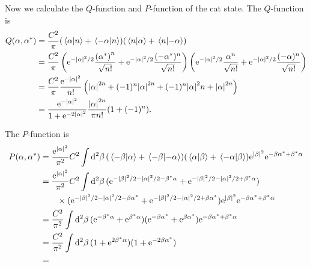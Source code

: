 \documentclass[hyperref, a4paper]{article}
\newcommand*{\ee}{\mathrm{e}}
\begin{document}
\begin{itemize}
    Now we calculate the $Q$-function and $P$-function of the cat state.
    The $Q$-function is 
    \[
        \begin{aligned}
            Q(\alpha, \alpha^*) &= \frac{C^2}{\pi} (\braket*{\alpha}{n} + \braket*{-\alpha}{n}) (\braket*{n}{\alpha} + \braket*{n}{-\alpha}) \\
            &= \frac{C^2}{\pi}  \left(  \ee^{-\abs{\alpha}^2/2} \frac{{(\alpha^*)}^n}{\sqrt{n!}} + \ee^{-\abs{\alpha}^2/2} \frac{(-\alpha^*)^n}{\sqrt{n!}} \right) \left(  \ee^{-\abs{\alpha}^2/2} \frac{{\alpha}^n}{\sqrt{n!}} + \ee^{-\abs{\alpha}^2/2} \frac{(-\alpha)^n}{\sqrt{n!}} \right) \\
            &= \frac{C^2}{\pi} \frac{\ee^{-\abs{\alpha}^2}}{n!} \left( \abs{\alpha}^{2n} + (-1)^n \abs{\alpha}^{2n} + (-1)^n \abs{\alpha}^2n + \abs{\alpha}^{2n} \right) \\
            &= \frac{\ee^{-\abs{\alpha}^2}}{1 + \ee^{- 2 \abs{\alpha}^2}} \frac{\abs{\alpha}^{2n}}{\pi n!} (1 + (-1)^n).
        \end{aligned}
    \]

    The $P$-function is 
    \[
        \begin{aligned}
            P(\alpha, \alpha^*) &= \frac{\ee^{\left| \alpha \right|^{2}}}{\pi^{2}} C^2 \int \dd[2]{\beta} (\braket*{-\beta}{\alpha} + \braket*{-\beta}{- \alpha}) (\braket*{\alpha}{\beta} + \braket*{-\alpha}{\beta}) \ee^{|\beta|^{2}} \ee^{-\beta \alpha^{*}+\beta^{*} \alpha} \\
            &= \frac{\ee^{\left| \alpha \right|^{2}}}{\pi^{2}} C^2 \int \dd[2]{\beta} (\ee^{- \abs{\beta}^2 / 2 - \abs{\alpha}^2 / 2 -\beta^* \alpha} + \ee^{- \abs{\beta}^2 / 2 - \abs{\alpha}^2 / 2 + \beta^* \alpha}) \\
            &\quad \quad \times (\ee^{- \abs{\beta}^2 / 2 - \abs{\alpha}^2 / 2 -\beta \alpha^*} + \ee^{- \abs{\beta}^2 / 2 - \abs{\alpha}^2 / 2 + \beta \alpha^*}) \ee^{|\beta|^{2}} \ee^{-\beta \alpha^{*}+\beta^{*} \alpha}  \\
            &= \frac{C^2}{\pi^2} \int \dd[2]{\beta} (\ee^{-\beta^* \alpha} + \ee^{\beta^* \alpha}) (\ee^{- \beta \alpha^*} + \ee^{\beta \alpha^*}) \ee^{-\beta \alpha^* + \beta^* \alpha} \\
            &= \frac{C^2}{\pi^2} \int \dd[2]{\beta} (1 + \ee^{2 \beta^* \alpha}) (1 + \ee^{-2 \beta \alpha^*}) \\
            &= 
        \end{aligned}
    \]
\end{itemize}
\end{document}
